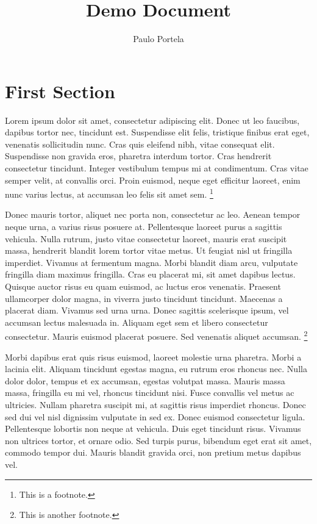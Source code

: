 \documentclass{article}
\begin{document}
	\title{Demo Document}  %
	\author{Paulo Portela}  %
	\maketitle  %
	\thispagestyle{empty}  %
	\newpage
	
	\setcounter{page}{1}  %
	
	\tableofcontents
	\newpage
	
	\setcounter{page}{1}  %
	
	\section{First Section}
	
	Lorem ipsum dolor sit amet, consectetur adipiscing elit. Donec ut leo faucibus, dapibus tortor nec, tincidunt est. Suspendisse elit felis, tristique finibus erat eget, venenatis sollicitudin nunc. Cras quis eleifend nibh, vitae consequat elit. Suspendisse non gravida eros, pharetra interdum tortor. Cras hendrerit consectetur tincidunt. Integer vestibulum tempus mi at condimentum. Cras vitae semper velit, at convallis orci. Proin euismod, neque eget efficitur laoreet, enim nunc varius lectus, at accumsan leo felis sit amet sem. \footnote{This is a footnote.}
	
	Donec mauris tortor, aliquet nec porta non, consectetur ac leo. Aenean tempor neque urna, a varius risus posuere at. Pellentesque laoreet purus a sagittis vehicula. Nulla rutrum, justo vitae consectetur laoreet, mauris erat suscipit massa, hendrerit blandit lorem tortor vitae metus. Ut feugiat nisl ut fringilla imperdiet. Vivamus at fermentum magna. Morbi blandit diam arcu, vulputate fringilla diam maximus fringilla. Cras eu placerat mi, sit amet dapibus lectus. Quisque auctor risus eu quam euismod, ac luctus eros venenatis. Praesent ullamcorper dolor magna, in viverra justo tincidunt tincidunt. Maecenas a placerat diam. Vivamus sed urna urna. Donec sagittis scelerisque ipsum, vel accumsan lectus malesuada in. Aliquam eget sem et libero consectetur consectetur. Mauris euismod placerat posuere. Sed venenatis aliquet accumsan. \footnote{This is another footnote.}
	
	Morbi dapibus erat quis risus euismod, laoreet molestie urna pharetra. Morbi a lacinia elit. Aliquam tincidunt egestas magna, eu rutrum eros rhoncus nec. Nulla dolor dolor, tempus et ex accumsan, egestas volutpat massa. Mauris massa massa, fringilla eu mi vel, rhoncus tincidunt nisi. Fusce convallis vel metus ac ultricies. Nullam pharetra suscipit mi, at sagittis risus imperdiet rhoncus. Donec sed dui vel nisl dignissim vulputate in sed ex. Donec euismod consectetur ligula. Pellentesque lobortis non neque at vehicula. Duis eget tincidunt risus. Vivamus non ultrices tortor, et ornare odio. Sed turpis purus, bibendum eget erat sit amet, commodo tempor dui. Mauris blandit gravida orci, non pretium metus dapibus vel.
	
\end{document}
